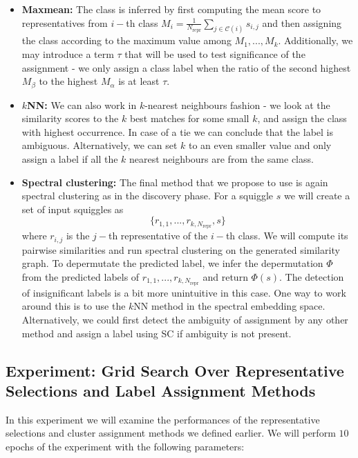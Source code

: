 \begin{itemize}
    \item \textbf{Maxmean:} The class is inferred by first computing the mean score to representatives from $i-$th class $M_i = \frac{1}{N_{\text{repr}}} \sum_{j \in \mathcal{C}(i)} s_{i, j}$ and then assigning the class according to the maximum value among $M_1, ..., M_{k}$. Additionally, we may introduce a term $\tau$ that will be used to test significance of the assignment - we only assign a class label when the ratio of the second highest $M_{\beta}$ to the highest $M_{\alpha}$ is at least $\tau$.
    \item \textbf{$k$NN:} We can also work in $k$-nearest neighbours fashion - we look at the similarity scores to the $k$ best matches for some small $k$, and assign the class with highest occurrence. In case of a tie we can conclude that the label is ambiguous. Alternatively, we can set $k$ to an even smaller value and only assign a label if all the $k$ nearest neighbours are from the same class. 
    \item \textbf{Spectral clustering:} The final method that we propose to use is again spectral clustering as in the discovery phase. For a squiggle $s$ we will create a set of input squiggles as
    $$ \{ r_{1, 1}, ..., r_{k, N_{\text{repr}}}, s \}$$ where $r_{i, j}$ is the $j-$th representative of the $i-$th class. We will compute its pairwise similarities and run spectral clustering on the generated similarity graph. To depermutate the predicted label, we infer the depermutation $\Phi$ from the predicted labels of $r_{1, 1}, ..., r_{k, N_{\text{repr}}}$ and return $\Phi(s)$. The detection of insignificant labels is a bit more unintuitive in this case. One way to work around this is to use the $k$NN method in the spectral embedding space. Alternatively, we could first detect the ambiguity of assignment by any other method and assign a label using SC if ambiguity is not present.
\end{itemize}

\subsection{Experiment: Grid Search Over Representative Selections and Label Assignment Methods}
In this experiment we will examine the performances of the representative selections and cluster assignment methods we defined earlier. We will perform $10$ epochs of the experiment with the following parameters:

